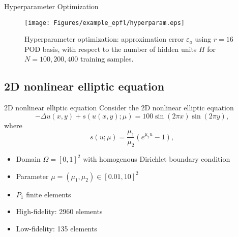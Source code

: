 \documentclass[10pt]{beamer}
\begin{document}
\begin{frame}{Hyperparameter Optimization}
\begin{figure}[htbp]
\centering
\vbox{
\texttt{[image: Figures/example\_epfl/hyperparam.eps]}
}
\caption{Hyperparameter optimization: approximation error $\varepsilon_a$ using $r = 16 $ POD basis, with respect to the number of hidden units $H$ for $N=100, 200, 400$ training samples.}
\label{example_epfl-hyperopt}
\end{figure}
\end{frame}


\subsection{2D nonlinear elliptic equation}

\begin{frame}{2D nonlinear elliptic equation}
Consider the 2D nonlinear elliptic equation
\begin{equation}
\label{example9}
    -\Delta u(x, y) +s(u(x, y); \mu) = 100\sin(2\pi x)\sin(2\pi y),
\end{equation}
where
\begin{equation}
    s(u; \mu) = \frac{\mu_1}{\mu_2}(e^{\mu_2 u}-1),
\end{equation}
\begin{itemize}
\item Domain $\Omega = [0, 1]^2 $ with homogenous Dirichlet boundary condition
\item Parameter $\mu = (\mu_1, \mu_2)\in [0.01, 10]^2 $
\item $P_1 $ finite elements
\item High-fidelity: 2960 elements
\item Low-fidelity: 135 elements
\end{itemize}
\end{frame}

\end{document}

